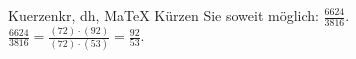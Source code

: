 \begin{MAufgabe}{Kuerzen}{kr, dh, MaTeX}
K\"urzen Sie soweit m\"oglich: $\frac{6624}{3816}$.\\ 
\ifLsg\MLoesung
\quad $\frac{6624}{3816}=\frac{(72)\cdot(92)}{(72)\cdot(53)}=\frac{92}{53}$.\else\relax\fi
 \end{MAufgabe}